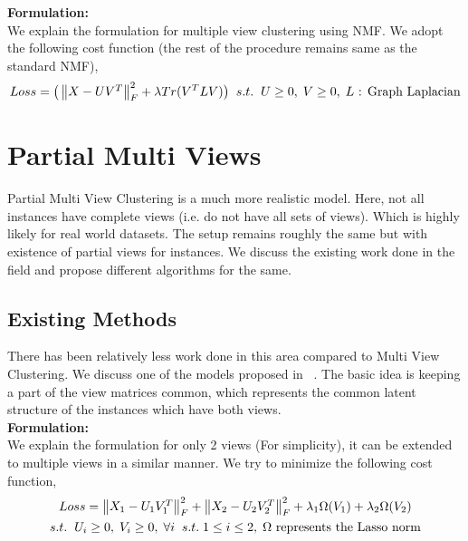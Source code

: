 \documentclass[a4paper]{article}
\begin{document}
	\noindent
	\textbf{Formulation:}\\
	We explain the formulation for multiple view clustering using NMF. We adopt the following cost function (the rest of the procedure remains same as the standard NMF),
	\begin{multline}	
	\hfill Loss = \big(\begin{Vmatrix} X-UV^{T} \end{Vmatrix}^{2}_{F}	
		+ \lambda Tr(V^{T} L V) \big) \;\; s.t. \hspace{2mm}  U\geq0,\; V\geq0,\;L\text{ : Graph Laplacian}
	\end{multline}	

	\section{Partial Multi Views}

Partial Multi View Clustering \cite{pvc15} is a much more realistic model. Here, not all instances have complete views (i.e. do not have all sets of views). Which is highly likely for real world datasets. The setup remains roughly the same but with existence of partial views for instances. We discuss the existing work done in the field and propose different algorithms for the same.

	\subsection{Existing Methods}

	There has been relatively less work done in this area compared to Multi View Clustering. We discuss one of the models proposed in ~\cite{pvc15}. The basic idea is keeping a part of the view matrices common, which represents the common latent structure of the instances which have both views.\\
	
	\noindent
	\textbf{Formulation:}\\
	We explain the formulation for only 2 views (For simplicity), it can be extended to multiple views in a similar manner. We try to minimize the following cost function,
	\begin{multline*}
	Loss = \begin{Vmatrix} X_{1}-U_{1}V^{T}_{1} \end{Vmatrix}^{2}_{F}	
		+ \begin{Vmatrix} X_{2}-U_{2}V^{T}_{2} \end{Vmatrix}^{2}_{F}
		+ \lambda_{1} \Omega(V_{1}) + \lambda_{2} \Omega (V_{2})\\	
		s.t. \hspace{2mm}  U_{i}\geq0,\;V_{i}\geq0,\;\forall i \;\;s.t.\; 1 \leq i \leq 2,
		\; \Omega \text{ represents the Lasso norm}
	\end{multline*}
\end{document}

